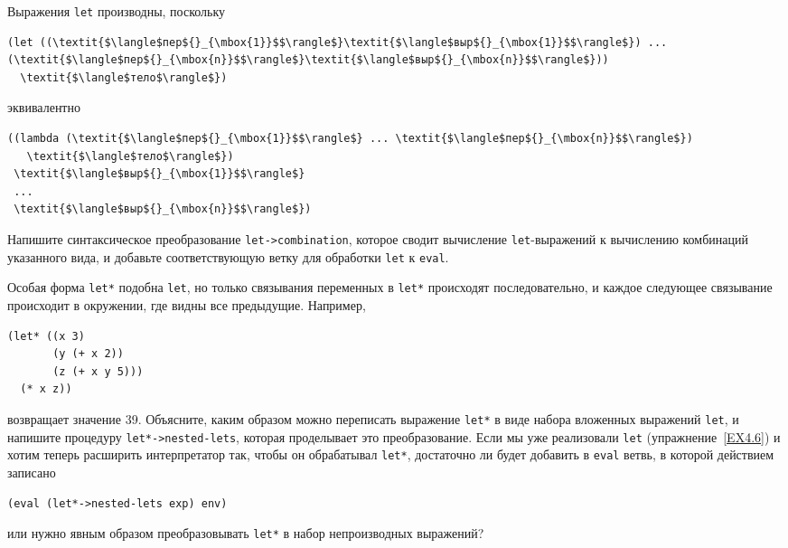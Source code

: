 \begin{exercise}{4.6}%
\label{EX4.6}%
%
Выражения {\tt let} производны, поскольку
\samepage

\begin{Verbatim}[fontsize=\small]
(let ((\textit{$\langle$пер${}_{\mbox{1}}$$\rangle$}\textit{$\langle$выр${}_{\mbox{1}}$$\rangle$}) ... (\textit{$\langle$пер${}_{\mbox{n}}$$\rangle$}\textit{$\langle$выр${}_{\mbox{n}}$$\rangle$}))
  \textit{$\langle$тело$\rangle$})
\end{Verbatim}
эквивалентно

\begin{Verbatim}[fontsize=\small]
((lambda (\textit{$\langle$пер${}_{\mbox{1}}$$\rangle$} ... \textit{$\langle$пер${}_{\mbox{n}}$$\rangle$})
   \textit{$\langle$тело$\rangle$})
 \textit{$\langle$выр${}_{\mbox{1}}$$\rangle$}
 ...
 \textit{$\langle$выр${}_{\mbox{n}}$$\rangle$})
\end{Verbatim}
Напишите синтаксическое преобразование {\tt let->combination},
которое сводит вычисление {\tt let}-выражений к вычислению
комбинаций указанного вида, и добавьте соответствующую ветку для
обработки {\tt let} к {\tt eval}.
\end{exercise}

\begin{exercise}{4.7}%
\label{EX4.7}%
Особая форма {\tt let*}
подобна {\tt let}, но только связывания 
переменных в {\tt let*}
происходят последовательно, и каждое следующее связывание происходит в
окружении, где видны все предыдущие.  Например,

\begin{Verbatim}[fontsize=\small]
(let* ((x 3)
       (y (+ x 2))
       (z (+ x y 5)))
  (* x z))
\end{Verbatim}
возвращает значение 39.  Объясните, каким образом
можно переписать выражение {\tt let*}
в виде набора вложенных выражений {\tt let}, и
напишите процедуру {\tt let*->nes\-ted-lets}, которая проделывает
это преобразование.  Если мы уже реализовали {\tt let}
(упражнение~\ref{EX4.6}) и хотим теперь расширить
интерпретатор так, чтобы он обрабатывал {\tt let*}, достаточно
ли будет добавить в {\tt eval} ветвь, в которой действием
записано

\begin{Verbatim}[fontsize=\small]
(eval (let*->nested-lets exp) env)
\end{Verbatim}
или нужно явным образом преобразовывать {\tt let*} в набор
непроизводных выражений?
\end{exercise}

